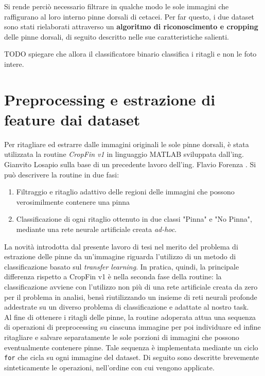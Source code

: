 Si rende perciò necessario filtrare in qualche modo le sole immagini che raffigurano al loro interno pinne dorsali di cetacei. Per far questo, i due dataset sono stati rielaborati attraverso un \textbf{algoritmo di riconoscimento e cropping} delle pinne dorsali, di seguito descritto nelle sue caratteristiche salienti.

TODO spiegare che allora il classificatore binario classifica i ritagli e non le foto intere.

\section{Preprocessing e estrazione di feature dai dataset}
Per ritagliare ed estrarre dalle immagini originali le sole pinne dorsali, è stata utilizzata la routine \textit{CropFin v1} in linguaggio MATLAB sviluppata dall'ing. Gianvito Losapio \cite{gianvito} sulla base di un precedente lavoro dell'ing. Flavio Forenza \cite{flavio}.
Si può descrivere la routine in due fasi:
\begin{enumerate}
\item Filtraggio e ritaglio adattivo delle regioni delle immagini che possono verosimilmente contenere una pinna
\item Classificazione di ogni ritaglio ottenuto in due classi "Pinna" e "No Pinna", mediante una rete neurale artificiale creata \textit{ad-hoc}.
\end{enumerate}

La novità introdotta dal presente lavoro di tesi nel merito del problema di estrazione delle pinne da un'immagine riguarda l'utilizzo di un metodo di classificazione basato sul \textit{transfer learning}. In pratica, quindi, la principale differenza rispetto a CropFin v1 è nella seconda fase della routine: la classificazione avviene con l'utilizzo non più di una rete artificiale creata da zero per il problema in analisi, bensì riutilizzando un insieme di reti neurali profonde addestrate su un diverso problema di classificazione e adattate al nostro task.\\

Al fine di ottenere i ritagli delle pinne, la routine adoperata attua una sequenza di operazioni di preprocessing su ciascuna immagine per poi individuare ed infine ritagliare e salvare separatamente le sole porzioni di immagini che possono eventualmente contenere pinne. Tale sequenza è implementata mediante un ciclo \verb|for| che cicla su ogni immagine del dataset. Di seguito sono descritte brevemente sinteticamente le operazioni, nell'ordine con cui vengono applicate.

